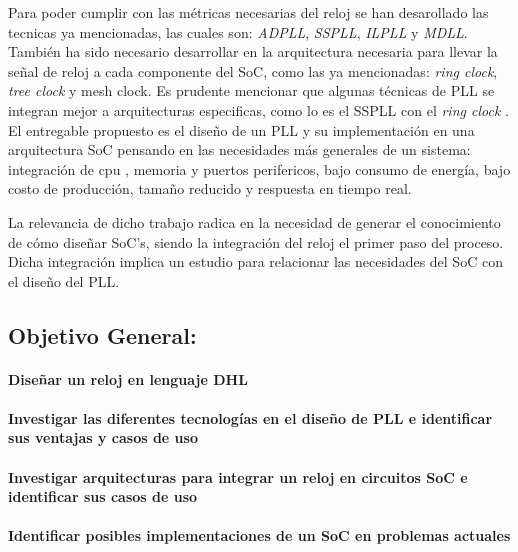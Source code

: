\documentclass[runningheads,a4paper]{llncs}
\begin{document}
Para poder cumplir con las métricas necesarias del reloj se han desarollado las tecnicas ya mencionadas, las cuales son: \textit{ADPLL}, \textit{SSPLL}, \textit{ILPLL} y \textit{MDLL}. También ha sido necesario desarrollar en la arquitectura necesaria para llevar la señal de reloj a cada componente del SoC, como las ya mencionadas: \textit{ring clock}, \textit{tree clock} y {mesh clock}. Es prudente mencionar que algunas técnicas de PLL se integran mejor a arquitecturas especificas, como lo es el SSPLL con el \textit{ring clock} . El entregable propuesto es el diseño de un PLL y su implementación en una arquitectura SoC pensando en las necesidades más generales de un sistema: integración de cpu , memoria y puertos perifericos, bajo consumo de energía, bajo costo de producción, tamaño reducido y respuesta en tiempo real. 

La relevancia de dicho trabajo radica en la necesidad de generar el conocimiento de cómo diseñar SoC's, siendo la integración del reloj el primer paso del proceso. Dicha integración implica un estudio para relacionar las necesidades del SoC con el diseño del PLL. 


\subsection{Objetivo General:}
\paragraph{Diseñar un reloj en lenguaje DHL}
\paragraph{Investigar las diferentes tecnologías en el diseño de PLL e identificar sus ventajas y casos de uso}
\paragraph{Investigar arquitecturas para integrar un reloj en circuitos SoC e identificar sus casos de uso}
\paragraph{Identificar posibles implementaciones de un SoC en problemas actuales}
\end{document}
